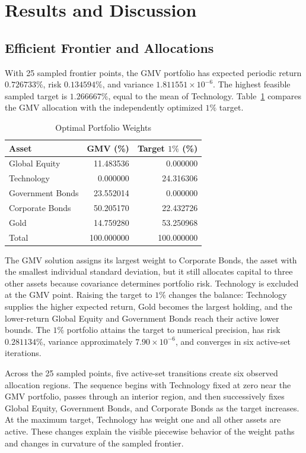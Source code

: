 \documentclass[conference]{IEEEtran}
\begin{document}
\section{Results and Discussion}

\subsection{Efficient Frontier and Allocations}

With 25 sampled frontier points, the GMV portfolio has expected periodic
return $0.726733\%$, risk $0.134594\%$, and variance
$1.811551\times10^{-6}$. The highest feasible sampled target is
$1.266667\%$, equal to the mean of Technology. Table~\ref{tab:weights}
compares the GMV allocation with the independently optimized $1\%$ target.

\begin{table}[!t]
\caption{Optimal Portfolio Weights}
\label{tab:weights}
\centering
\footnotesize
\begin{tabular}{lrr}
\toprule
Asset & GMV (\%) & Target $1\%$ (\%)\\
\midrule
Global Equity    & 11.483536 & 0.000000\\
Technology       & 0.000000  & 24.316306\\
Government Bonds & 23.552014 & 0.000000\\
Corporate Bonds  & 50.205170 & 22.432726\\
Gold             & 14.759280 & 53.250968\\
\midrule
Total            & 100.000000 & 100.000000\\
\bottomrule
\end{tabular}
\end{table}

The GMV solution assigns its largest weight to Corporate Bonds, the asset with
the smallest individual standard deviation, but it still allocates capital to
three other assets because covariance determines portfolio risk. Technology is
excluded at the GMV point. Raising the target to $1\%$ changes the balance:
Technology supplies the higher expected return, Gold becomes the largest
holding, and the lower-return Global Equity and Government Bonds reach their
active lower bounds. The $1\%$ portfolio attains the target to numerical
precision, has risk $0.281134\%$, variance approximately
$7.90\times10^{-6}$, and converges in six active-set iterations.

Across the 25 sampled points, five active-set transitions create six observed
allocation regions. The sequence begins with Technology fixed at zero near the
GMV portfolio, passes through an interior region, and then successively fixes
Global Equity, Government Bonds, and Corporate Bonds as the target increases.
At the maximum target, Technology has weight one and all other assets are
active. These changes explain the visible piecewise behavior of the weight
paths and changes in curvature of the sampled frontier.
\end{document}
